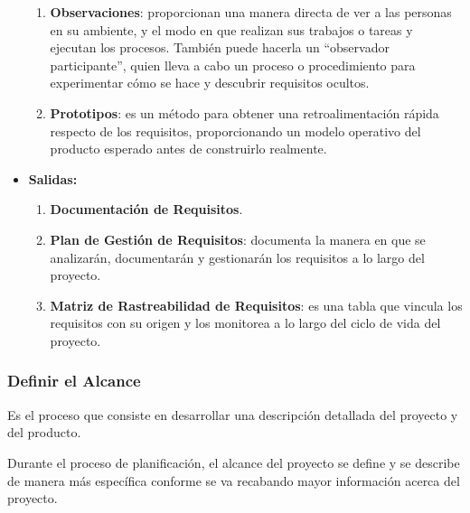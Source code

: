 \documentclass[10pt,a4paper]{article}
\begin{document}
\begin{itemize}
\begin{enumerate}
\item \textbf{Observaciones}: proporcionan una manera directa de ver a las personas en su ambiente, y el modo en que realizan sus trabajos o tareas y ejecutan los procesos. También puede hacerla un “observador participante”, quien lleva a cabo un proceso o procedimiento para experimentar cómo se hace y descubrir requisitos ocultos.
\item \textbf{Prototipos}: es un método para obtener una retroalimentación rápida respecto de los requisitos, proporcionando un modelo operativo del producto esperado antes de construirlo realmente.
\end{enumerate}

\item \textbf{Salidas:}
\begin{enumerate}
\item \textbf{Documentación de Requisitos}.
\item \textbf{Plan de Gestión de Requisitos}: documenta la manera en que se
analizarán, documentarán y gestionarán los requisitos a lo largo del
proyecto.
\item \textbf{Matriz de Rastreabilidad de Requisitos}: es una tabla que vincula los requisitos con su origen y los monitorea a lo largo del ciclo de vida del proyecto.
\end{enumerate}
\end{itemize}

\subsubsection{Definir el Alcance}
Es el proceso que consiste en desarrollar una descripción detallada del proyecto y del producto.

Durante el proceso de planificación, el alcance del proyecto se define y se describe de manera más específica conforme se va recabando mayor información acerca del proyecto.
\end{document}
